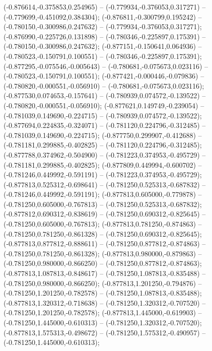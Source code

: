  (-0.876614,-0.375853,0.254965) -- (-0.779934,-0.376053,0.317271) -- (-0.779699,-0.451092,0.384304);
 (-0.876811,-0.300799,0.195242) -- (-0.780150,-0.300986,0.247632) -- (-0.779934,-0.376053,0.317271);
 (-0.876990,-0.225726,0.131898) -- (-0.780346,-0.225897,0.175391) -- (-0.780150,-0.300986,0.247632);
 (-0.877151,-0.150641,0.064936) -- (-0.780523,-0.150791,0.100551) -- (-0.780346,-0.225897,0.175391);
 (-0.877295,-0.075546,-0.005643) -- (-0.780681,-0.075673,0.023116) -- (-0.780523,-0.150791,0.100551);
 (-0.877421,-0.000446,-0.079836) -- (-0.780820,-0.000551,-0.056910) -- (-0.780681,-0.075673,0.023116);
 (-0.877530,0.074653,-0.157641) -- (-0.780939,0.074572,-0.139522) -- (-0.780820,-0.000551,-0.056910);
 (-0.877621,0.149749,-0.239054) -- (-0.781039,0.149690,-0.224715) -- (-0.780939,0.074572,-0.139522);
 (-0.877694,0.224835,-0.324071) -- (-0.781120,0.224796,-0.312485) -- (-0.781039,0.149690,-0.224715);
 (-0.877750,0.299907,-0.412688) -- (-0.781181,0.299885,-0.402825) -- (-0.781120,0.224796,-0.312485);
 (-0.877788,0.374962,-0.504900) -- (-0.781223,0.374953,-0.495729) -- (-0.781181,0.299885,-0.402825);
 (-0.877809,0.449994,-0.600702) -- (-0.781246,0.449992,-0.591191) -- (-0.781223,0.374953,-0.495729);
 (-0.877813,0.525312,-0.698641) -- (-0.781250,0.525313,-0.687832) -- (-0.781246,0.449992,-0.591191);
 (-0.877813,0.605000,-0.779878) -- (-0.781250,0.605000,-0.767813) -- (-0.781250,0.525313,-0.687832);
 (-0.877812,0.690312,-0.838619) -- (-0.781250,0.690312,-0.825645) -- (-0.781250,0.605000,-0.767813);
 (-0.877813,0.781250,-0.874863) -- (-0.781250,0.781250,-0.861328) -- (-0.781250,0.690312,-0.825645);
 (-0.877813,0.877812,-0.888611) -- (-0.781250,0.877812,-0.874863) -- (-0.781250,0.781250,-0.861328);
 (-0.877813,0.980000,-0.879863) -- (-0.781250,0.980000,-0.866250) -- (-0.781250,0.877812,-0.874863);
 (-0.877813,1.087813,-0.848617) -- (-0.781250,1.087813,-0.835488) -- (-0.781250,0.980000,-0.866250);
 (-0.877813,1.201250,-0.794876) -- (-0.781250,1.201250,-0.782578) -- (-0.781250,1.087813,-0.835488);
 (-0.877813,1.320312,-0.718638) -- (-0.781250,1.320312,-0.707520) -- (-0.781250,1.201250,-0.782578);
 (-0.877813,1.445000,-0.619903) -- (-0.781250,1.445000,-0.610313) -- (-0.781250,1.320312,-0.707520);
 (-0.877813,1.575313,-0.498672) -- (-0.781250,1.575312,-0.490957) -- (-0.781250,1.445000,-0.610313);
